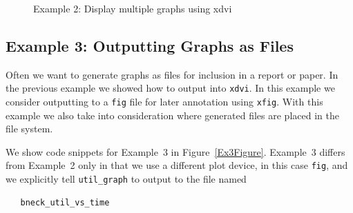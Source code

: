 \documentclass[11pt]{article}
\begin{document}
\begin{figure}[ht]
\begin{center}
\end{center}
\caption{Example 2: Display multiple graphs using xdvi}\label{Ex2Figure}
\end{figure}

\subsection{Example 3: Outputting Graphs as Files}

Often we want to generate graphs as files for inclusion in a 
report or paper.  In the previous example we showed how to output into
\verb|xdvi|.  In this example we consider outputting to a \verb|fig|
file for later annotation using \verb|xfig|.  With this example we also take
into consideration where generated files are placed in the file
system.

We show code snippets for Example~3 in Figure~\ref{Ex3Figure}.  
Example~3 differs from Example~2 only in that we use a different 
plot device, in this case \verb|fig|, and we explicitly tell
\verb|util_graph| to output to the file named 

\begin{verbatim}
   bneck_util_vs_time
\end{verbatim}
\end{document}
